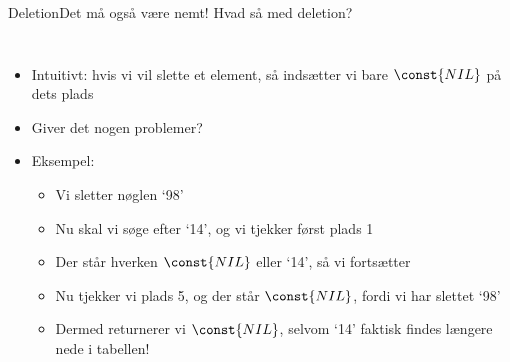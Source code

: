 \documentclass[aspectratio=1610]{beamer}
\begin{document}
\begin{frame}{Deletion}{Det må også være nemt!}
    Hvad så med deletion?
    \begin{columns}
        \begin{itemize}
            \item<2-> Intuitivt: hvis vi vil slette et element, så indsætter vi bare
                $\const{NIL}$ på dets plads
            \item<3-> Giver det nogen problemer?
            \item<4-> Eksempel:
                \begin{itemize}
                    \item<5-> Vi sletter nøglen `98'
                    \item<6-> Nu skal vi søge efter `14', og vi tjekker først plads
                        1
                    \item<7-> Der står hverken $\const{NIL}$ eller `14', så vi
                        fortsætter
                    \item<8-> Nu tjekker vi plads 5, og der står $\const{NIL}$,
                        fordi vi har slettet `98'
                    \item<9-> Dermed returnerer vi $\const{NIL}$, selvom `14'
                        faktisk findes længere nede i tabellen!
                \end{itemize}
        \end{itemize}


\end{columns}
\end{frame}
\end{document}
